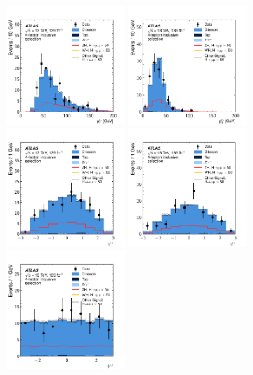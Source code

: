 \clearpage
\begin{figure}[htpb]
  \centering
  \includegraphics[width=0.4\textwidth]{figures/hmm/kinematics/histo-4lep-aux1_pt.pdf}
  \includegraphics[width=0.4\textwidth]{figures/hmm/kinematics/histo-4lep-aux2_pt.pdf}
  \includegraphics[width=0.4\textwidth]{figures/hmm/kinematics/histo-4lep-aux1_eta.pdf}
  \includegraphics[width=0.4\textwidth]{figures/hmm/kinematics/histo-4lep-aux2_eta.pdf}
  \includegraphics[width=0.4\textwidth]{figures/hmm/kinematics/histo-4lep-aux1_phi.pdf}

\end{figure}
